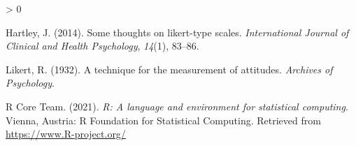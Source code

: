 \documentclass[
  english,
  man,floatsintext]{apa6}
\newlength{\cslhangindent}
\newenvironment{CSLReferences}[2] %
 {%
  \setlength{\parindent}{0pt}
  \ifodd #1 \everypar{\setlength{\hangindent}{\cslhangindent}}\ignorespaces\fi
  \ifnum #2 > 0
  \setlength{\parskip}{#2\baselineskip}
  \fi
 }%
 {}
\begin{document}
\begingroup
\setlength{\parindent}{-0.5in}
\setlength{\leftskip}{0.5in}

\hypertarget{refs}{}
\begin{CSLReferences}{1}{0}
\leavevmode\hypertarget{ref-hartley2014some}{}%
Hartley, J. (2014). Some thoughts on likert-type scales. \emph{International Journal of Clinical and Health Psychology}, \emph{14}(1), 83--86.

\leavevmode\hypertarget{ref-likert1932technique}{}%
Likert, R. (1932). A technique for the measurement of attitudes. \emph{Archives of Psychology}.

\leavevmode\hypertarget{ref-R-base}{}%
R Core Team. (2021). \emph{R: A language and environment for statistical computing}. Vienna, Austria: R Foundation for Statistical Computing. Retrieved from \url{https://www.R-project.org/}

\end{CSLReferences}

\endgroup
\end{document}
